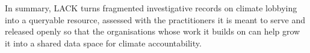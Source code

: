 \begin{sloppypar}
In summary, LACK turns fragmented investigative records on climate lobbying into a queryable resource, assessed with the practitioners it is meant to serve and released openly so that the organisations whose work it builds on can help grow it into a shared data space for climate accountability.
\end{sloppypar}